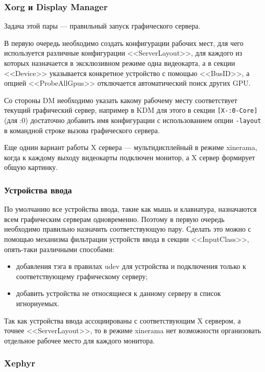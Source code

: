 \documentclass[10pt, a5paper]{article}
\begin{document}
\subsubsection*{Xorg и Display Manager}

Задача этой пары --- правильный запуск графического сервера.

В первую очередь необходимо создать конфигурации рабочих мест, для чего используется 
различные конфигурации \linebreak <<ServerLayout>>, для каждого из которых назначается в эксклюзивном режиме
одна видеокарта, а в секции <<Device>> указывается конкретное устройство с помощью <<BusID>>,
а опцией <<ProbeAllGpus>> отключается автоматический поиск других GPU.

Со стороны DM необходимо указать какому рабочему месту соответствует текущий графический сервер, 
например в KDM для этого в секции {\tt [X-:0-Core]} (для :0)  достаточно добавить имя конфигурации 
с использованием опции {\tt -layout} в командной строке вызова графического сервера.

Еще однин вариант работы X сервера --- мультидисплейный в режиме xinerama, когда к каждому выходу
видеокарты подключен монитор, а X сервер формирует общую картинку.

\subsubsection*{Устройства ввода}

По умолчанию все устройства ввода, такие как мышь и клавиатура, назначаются всем графическим серверам
одновременно. Поэтому в первую очередь необходимо правильно назначить соответствующую пару.
Сделать это можно с помощью механизма фильтрации устройств ввода в секции <<InputClass>>, 
опять-таки различными способами:
\begin{itemize}
	\item добавления тэга в правилах udev для устройства и подключения 
		только к соответствующему графическому серверу;
	\item добавить устройства не относящиеся к данному серверу в список игнориуемых.
\end{itemize}

Так как устройства ввода ассоциированы с соответствующим X сервером, а точнее <<ServerLayout>>, 
то в режиме xinerama нет возможности организовать отдельное рабочее место для каждого монитора.

\subsubsection*{Xephyr}
\end{document}
